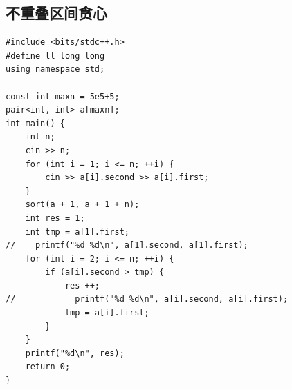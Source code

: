 \documentclass[twoside]{article}
\begin{document}
\subsection{不重叠区间贪心}
\begin{lstlisting}
#include <bits/stdc++.h>
#define ll long long
using namespace std;

const int maxn = 5e5+5;
pair<int, int> a[maxn];
int main() {
    int n;
    cin >> n;
    for (int i = 1; i <= n; ++i) {
        cin >> a[i].second >> a[i].first;
    }
    sort(a + 1, a + 1 + n);
    int res = 1;
    int tmp = a[1].first;
//    printf("%d %d\n", a[1].second, a[1].first);
    for (int i = 2; i <= n; ++i) {
        if (a[i].second > tmp) {
            res ++;
//            printf("%d %d\n", a[i].second, a[i].first);
            tmp = a[i].first;
        }
    }
    printf("%d\n", res);
    return 0;
}

\end{lstlisting}
\end{document}
